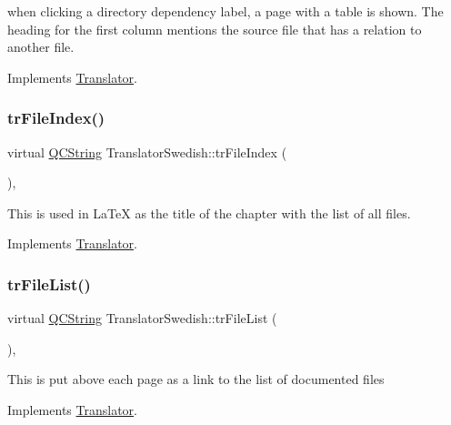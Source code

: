 when clicking a directory dependency label, a page with a table is shown. The heading for the first column mentions the source file that has a relation to another file. 

Implements \mbox{\hyperlink{class_translator}{Translator}}.

\mbox{\label{class_translator_swedish_a2336e8e023eb3c6937bf0e206d70d80d}} 
\subsubsection{\texorpdfstring{trFileIndex()}{trFileIndex()}}
{\footnotesize\ttfamily virtual \mbox{\hyperlink{class_q_c_string}{Q\+C\+String}} Translator\+Swedish\+::tr\+File\+Index (\begin{DoxyParamCaption}{ }\end{DoxyParamCaption})\hspace{0.3cm}{\ttfamily [inline]}, {\ttfamily [virtual]}}

This is used in La\+TeX as the title of the chapter with the list of all files. 

Implements \mbox{\hyperlink{class_translator}{Translator}}.

\mbox{\label{class_translator_swedish_acc94531a56e349bb2ea509470b5e2e88}} 
\subsubsection{\texorpdfstring{trFileList()}{trFileList()}}
{\footnotesize\ttfamily virtual \mbox{\hyperlink{class_q_c_string}{Q\+C\+String}} Translator\+Swedish\+::tr\+File\+List (\begin{DoxyParamCaption}{ }\end{DoxyParamCaption})\hspace{0.3cm}{\ttfamily [inline]}, {\ttfamily [virtual]}}

This is put above each page as a link to the list of documented files 

Implements \mbox{\hyperlink{class_translator}{Translator}}.

\mbox{\label{class_translator_swedish_a107d4f8a438d6c6308ca9ea883798fcd}} 

